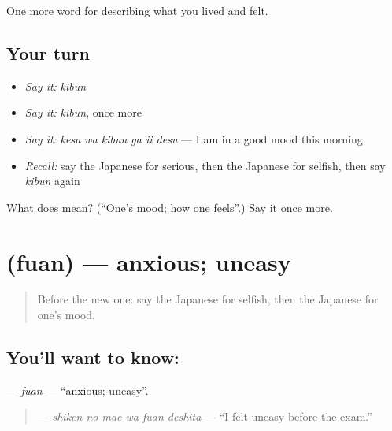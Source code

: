 \begin{grammarlens}[title={What you've built}]
One more word for describing what you lived and felt.
\end{grammarlens}

\subsection*{Your turn}
\begin{itemize}
\raggedright
  \item \emph{Say it:} \emph{kibun}
  \item \emph{Say it:} \emph{kibun}, once more
  \item \emph{Say it:} \emph{kesa wa kibun ga ii desu} — I am in a good mood this morning.
  \item \emph{Recall:} say the Japanese for serious, then the Japanese for selfish, then say \emph{kibun} again
\end{itemize}

\begin{tcolorbox}[breakable,colback=teal!4,colframe=teal!35!black,title={Before you move on}]
What does  mean? (\textquotedblleft{}One's mood; how one feels\textquotedblright{}.) Say it once more.
\end{tcolorbox}
\section[\texorpdfstring{\ja{ふあん} (fuan)}{ふあん (fuan)}]{ (fuan) — anxious; uneasy}

\label{lesson:JA-C426-fuan}



\begin{quote}
Before the new one: say the Japanese for selfish, then the Japanese for one's mood.
\end{quote}

\subsection*{You'll want to know: }
\textbf{} — \emph{fuan} — \textquotedblleft{}anxious; uneasy\textquotedblright{}.

\begin{quote}
\textbf{  } — \emph{shiken no mae wa fuan deshita} — \textquotedblleft{}I felt uneasy before the exam.\textquotedblright{}
\end{quote}

